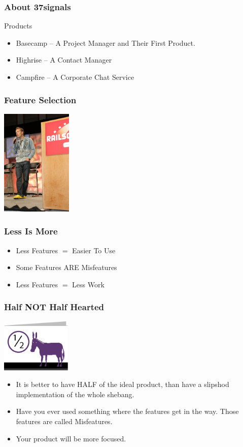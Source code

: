 \documentclass[10pt]{beamer}
\begin{document}
\begin{frame}
  \frametitle{About 37signals}
  Products
  \pause
  \begin{itemize}
  \item Basecamp -- A Project Manager and Their First Product.
   \pause
  \item Highrise -- A Contact Manager
  \pause
  \item Campfire -- A Corporate Chat Service
  \end{itemize}
\end{frame}
\begin{frame}
  \frametitle{Feature Selection}
  \includegraphics[height=2in]{dhh-railsconf}
\end{frame}
\begin{frame}
  \frametitle{Less Is More}
  \pause
  \begin{itemize}
  \item Less Features $=$ Easier To Use
  \pause
  \item Some Features ARE Misfeatures
  \pause
  \item Less Features $=$ Less Work
  \end{itemize}
\end{frame}
\begin{frame}
  \frametitle{Half NOT Half Hearted}
  \includegraphics[height=1in]{halfass}
  \pause
  \begin{itemize}
  \item It is better to have HALF of the ideal product,
    than have a slipshod implementation of the whole shebang.
    \pause
  \item Have you ever used something where the features get in the way.
    Those features are called Misfeatures.
    \pause
  \item Your product will be more focused.
  \end{itemize}
\end{frame}
\end{document}
